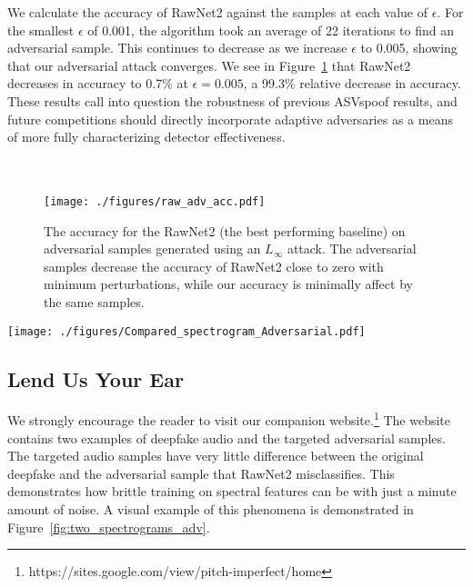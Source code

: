 \documentclass[10pt, journal, anonymous=true]{IEEEtran}
\begin{document}
We calculate the accuracy of RawNet2 against the samples at each value of $\epsilon$. 
For the smallest
$\epsilon$ of 0.001, the algorithm took an average of 22 iterations to find an adversarial sample. This continues
to decrease as we increase $\epsilon$ to 0.005, showing that our adversarial attack converges.
We see in Figure~\ref{fig:adv_accuracy} that RawNet2 decreases in accuracy to 0.7\% at $\epsilon=0.005$, a 99.3\% relative decrease in accuracy. These results call into question the robustness of previous ASVspoof results, and future competitions should directly incorporate adaptive adversaries as a means of more fully characterizing detector effectiveness. 
\\
\\ \noindent{}
\\
\begin{figure}[!t]
	\begin{center}
			\texttt{[image: ./figures/raw\_adv\_acc.pdf]}
			\caption{ 
				The accuracy for the RawNet2 (the best performing baseline) on adversarial samples generated using
				an $L_{\infty}$ attack. The
				adversarial samples decrease the accuracy of RawNet2 close to zero with minimum perturbations, while 
				our accuracy is minimally affect by the same samples. 
			} 
			\label{fig:adv_accuracy}
		\end{center}
	\end{figure}
\begin{figure*}
	\begin{center}
		\texttt{[image: ./figures/Compared\_spectrogram\_Adversarial.pdf]}
		\caption{Examples of the spectrogram and fundamental frequency sequences for a deepfake 
		and the same deepfake modified by our adaptive adversary attack.
		Adversarial differences are highlighted above and illustrate the addition of white noise throughout the sample.
		However, the pitch information in black remains unchanged throughout the attack.} 
		\label{fig:two_spectrograms_adv}
	\end{center}
\end{figure*} 

\subsection{Lend Us Your Ear} \label{website} We strongly encourage the reader to visit our companion website.\footnote{https://sites.google.com/view/pitch-imperfect/home} The website contains two examples of 
deepfake audio and the targeted adversarial samples. The targeted audio samples have very little difference
between the original deepfake and the adversarial sample that RawNet2 misclassifies. This demonstrates how brittle
training on spectral features can be with just a minute amount of noise.
 A visual example of this phenomena
is demonstrated in Figure~\ref{fig:two_spectrograms_adv}.
\end{document}
